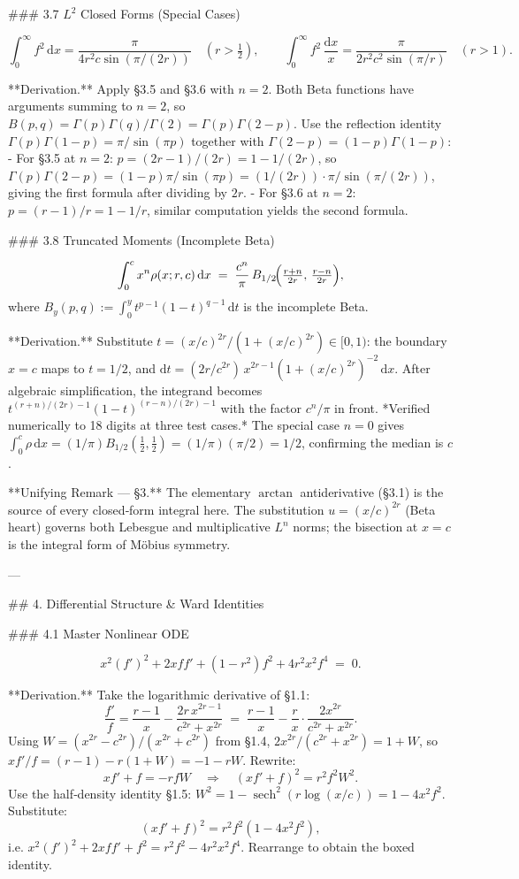 ### 3.7 $L^{2}$ Closed Forms (Special Cases)

$$
\int_{0}^{\infty}f^{2}\,\mathrm dx = \frac{\pi}{4r^{2}c\sin(\pi/(2r))}\quad(r>\tfrac{1}{2}),\qquad \int_{0}^{\infty}f^{2}\,\frac{\mathrm dx}{x} = \frac{\pi}{2r^{2}c^{2}\sin(\pi/r)}\quad(r>1).
$$

**Derivation.** Apply §3.5 and §3.6 with $n=2$. Both Beta functions have arguments summing to $n=2$, so $B(p,q) = \Gamma(p)\Gamma(q)/\Gamma(2) = \Gamma(p)\Gamma(2-p)$. Use the reflection identity $\Gamma(p)\Gamma(1-p)=\pi/\sin(\pi p)$ together with $\Gamma(2-p) = (1-p)\Gamma(1-p)$:
- For §3.5 at $n=2$: $p = (2r-1)/(2r) = 1 - 1/(2r)$, so $\Gamma(p)\Gamma(2-p) = (1-p)\pi/\sin(\pi p) = (1/(2r))\cdot\pi/\sin(\pi/(2r))$, giving the first formula after dividing by $2r$.
- For §3.6 at $n=2$: $p = (r-1)/r = 1-1/r$, similar computation yields the second formula.

### 3.8 Truncated Moments (Incomplete Beta)

$$
\int_{0}^{c}x^{n}\rho(x;r,c)\,\mathrm dx \;=\; \frac{c^{n}}{\pi}\,B_{1/2}\!\Bigl(\tfrac{r+n}{2r},\,\tfrac{r-n}{2r}\Bigr),
$$
where $B_{y}(p,q) := \int_{0}^{y}t^{p-1}(1-t)^{q-1}\,\mathrm dt$ is the incomplete Beta.

**Derivation.** Substitute $t = (x/c)^{2r}/(1+(x/c)^{2r}) \in [0,1)$: the boundary $x=c$ maps to $t=1/2$, and $\mathrm dt = (2r/c^{2r})\,x^{2r-1}(1+(x/c)^{2r})^{-2}\,\mathrm dx$. After algebraic simplification, the integrand becomes $t^{(r+n)/(2r)-1}(1-t)^{(r-n)/(2r)-1}$ with the factor $c^{n}/\pi$ in front. *Verified numerically to 18 digits at three test cases.* The special case $n=0$ gives $\int_{0}^{c}\rho\,\mathrm dx = (1/\pi)B_{1/2}(\tfrac{1}{2},\tfrac{1}{2}) = (1/\pi)(\pi/2) = 1/2$, confirming the median is $c$.

**Unifying Remark — §3.** The elementary $\arctan$ antiderivative (§3.1) is the source of every closed‑form integral here. The substitution $u=(x/c)^{2r}$ (Beta heart) governs both Lebesgue and multiplicative $L^{n}$ norms; the bisection at $x=c$ is the integral form of Möbius symmetry.

---

## 4. Differential Structure & Ward Identities

### 4.1 Master Nonlinear ODE

$$
\boxed{\;x^{2}(f')^{2} + 2x f f' + (1-r^{2})f^{2} + 4r^{2}x^{2}f^{4} \;=\; 0.\;}
$$

**Derivation.** Take the logarithmic derivative of §1.1:
$$
\frac{f'}{f} = \frac{r-1}{x} - \frac{2r\,x^{2r-1}}{c^{2r}+x^{2r}} \;=\; \frac{r-1}{x} - \frac{r}{x}\cdot\frac{2x^{2r}}{c^{2r}+x^{2r}}.
$$
Using $W = (x^{2r}-c^{2r})/(x^{2r}+c^{2r})$ from §1.4, $2x^{2r}/(c^{2r}+x^{2r}) = 1+W$, so $xf'/f = (r-1) - r(1+W) = -1 - rW$. Rewrite:
$$
xf' + f = -rfW \quad\Longrightarrow\quad (xf'+f)^{2} = r^{2}f^{2}W^{2}.
$$
Use the half‑density identity §1.5: $W^{2} = 1 - \operatorname{sech}^{2}(r\log(x/c)) = 1 - 4x^{2}f^{2}$. Substitute:
$$
(xf'+f)^{2} = r^{2}f^{2}(1-4x^{2}f^{2}),
$$
i.e. $x^{2}(f')^{2} + 2xff' + f^{2} = r^{2}f^{2} - 4r^{2}x^{2}f^{4}$. Rearrange to obtain the boxed identity.

